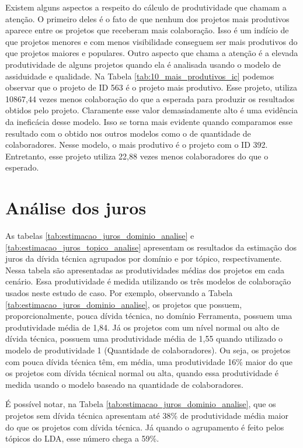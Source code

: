 Existem alguns aspectos a respeito do cálculo de produtividade que chamam a atenção. O primeiro deles é o fato de que nenhum dos projetos mais produtivos aparece entre os projetos que receberam mais colaboração. Isso é um indício de que projetos menores e com menos visibilidade conseguem ser mais produtivos do que projetos maiores e populares. Outro aspecto que chama a atenção é a elevada produtividade de alguns projetos quando ela é analisada usando o modelo de assiduidade e qualidade. Na Tabela \ref{tab:10_mais_produtivos_ic}  podemos observar que o projeto de ID 563 é o projeto mais produtivo. Esse projeto, utiliza 10867,44 vezes menos colaboração do que a esperada para produzir os resultados obtidos pelo projeto.  Claramente esse valor demasiadamente alto é uma evidência da ineficácia desse modelo. Isso se torna mais evidente quando comparamos esse resultado com o obtido nos outros modelos como o de quantidade de colaboradores. Nesse modelo, o mais produtivo é o projeto com o  ID 392. Entretanto, esse projeto utiliza 22,88 vezes menos colaboradores do que o esperado.  



\section{Análise dos juros}

 

As tabelas \ref{tab:estimacao_juros_dominio_analise} e \ref{tab:estimacao_juros_topico_analise} apresentam os resultados da estimação dos juros da dívida técnica agrupados por domínio e por tópico, respectivamente. Nessa tabela são apresentadas as produtividades médias dos projetos em cada cenário. Essa produtividade é medida utilizando os três modelos de colaboração usados neste estudo de caso. Por exemplo, observando a Tabela \ref{tab:estimacao_juros_dominio_analise}, os projetos que possuem, proporcionalmente, pouca dívida técnica, no domínio Ferramenta,  possuem uma produtividade média de 1,84. Já os projetos com um nível normal ou alto de dívida técnica, possuem uma produtividade média de 1,55 quando utilizado o modelo de produtividade 1 (Quantidade de colaboradores). Ou seja, os projetos com pouca dívida técnica têm, em média, uma produtividade 16\% maior do que os projetos com dívida técnical normal ou alta, quando essa produtividade é medida usando o modelo baseado na quantidade de colaboradores.

É possível notar, na Tabela \ref{tab:estimacao_juros_dominio_analise}, que os projetos sem dívida técnica apresentam até 38\% de produtividade média maior do que os projetos com dívida técnica. Já quando o agrupamento é feito pelos tópicos do LDA, esse número chega a 59\%.

